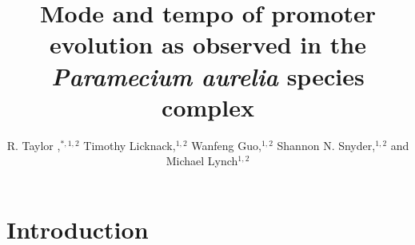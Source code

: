 \documentclass[nogrid]{MBE}%
\begin{document}
\title{Mode and tempo of promoter evolution as observed in the \textit{Paramecium aurelia} species complex}

\author[Raborn et al.]{R. Taylor ,$^{\ast,1,2}$ Timothy Licknack,$^{1,2}$ Wanfeng Guo,$^{1,2}$ Shannon N. Snyder,$^{1,2}$ and Michael Lynch$^{1,2}$}

\address{$^{1}$Biodesign Institute Center for the Mechanisms of Evolution\\
$^{2}$School of Life Sciences\\
Arizona State University, 797 E. Tyler Street, Tempe, AZ 85281}







\maketitle


\section{{Introduction}\label{sec:Intro}}
\end{document}
